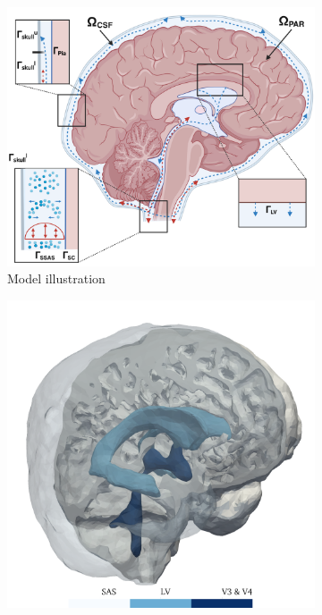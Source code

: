 \documentclass[fleqn,10pt]{wlscirep}
\begin{document}

\begin{figure}[h!]
\centering 
\begin{subfigure}[b]{0.33\textwidth}
\includegraphics[width = 1 \textwidth]{figures/CSF flow & dispersion.png}
\caption{Model illustration}
\label{fig:csf_flow_geom}
\end{subfigure}
\begin{subfigure}[b]{0.33\textwidth}
\includegraphics[width = 1 \textwidth]{figures/subdomains.png}

\end{subfigure}
\end{figure}
\end{document}
